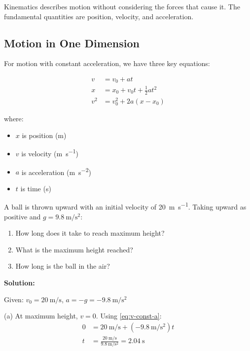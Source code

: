 \documentclass[11pt]{book}
\begin{document}
Kinematics describes motion without considering the forces that cause it. The fundamental quantities are position, velocity, and acceleration.

\subsection{Motion in One Dimension}

For motion with constant acceleration, we have three key equations:

\begin{align}
    v &= v_0 + at \label{eq:v-const-a} \\
    x &= x_0 + v_0 t + \frac{1}{2}at^2 \label{eq:x-const-a} \\
    v^2 &= v_0^2 + 2a(x - x_0) \label{eq:v2-const-a}
\end{align}

where:
\begin{itemize}
    \item $x$ is position (\si{\meter})
    \item $v$ is velocity (\si{\meter\per\second})
    \item $a$ is acceleration (\si{\meter\per\second\squared})
    \item $t$ is time (\si{\second})
\end{itemize}

\begin{examplebox}[title=Example 1.1]
A ball is thrown upward with an initial velocity of \SI{20}{\meter\per\second}. Taking upward as positive and $g = \SI{9.8}{\meter\per\second\squared}$:

\begin{enumerate}[label=(\alph*)]
    \item How long does it take to reach maximum height?
    \item What is the maximum height reached?
    \item How long is the ball in the air?
\end{enumerate}
\end{examplebox}

\textbf{Solution:}

Given: $v_0 = \SI{20}{\meter\per\second}$, $a = -g = \SI{-9.8}{\meter\per\second\squared}$

(a) At maximum height, $v = 0$. Using \cref{eq:v-const-a}:
\begin{align}
    0 &= \SI{20}{\meter\per\second} + (\SI{-9.8}{\meter\per\second\squared})t \\
    t &= \frac{\SI{20}{\meter\per\second}}{\SI{9.8}{\meter\per\second\squared}} = \SI{2.04}{\second}
\end{align}
\end{document}
